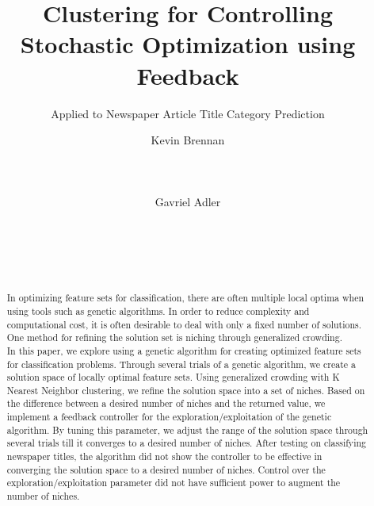 \documentclass{sig-alternate}
\begin{document}
%

\title{Clustering for Controlling Stochastic Optimization using Feedback}
\subtitle{Applied to Newspaper Article Title Category Prediction}

\author{
\alignauthor
Kevin Brennan\\
       \\
       \\
       \\
\alignauthor
Gavriel Adler\\
       \\
       \\
       \\
       \\
}


\maketitle
\begin{abstract}
In optimizing feature sets for classification, there are often multiple local optima when using tools such as genetic algorithms. In order to reduce complexity and computational cost, it is often desirable to deal with only a fixed number of solutions. One method for refining the solution set is niching through generalized crowding.\\
\indent In this paper, we explore using a genetic algorithm for creating optimized feature sets for classification problems. Through several trials of a genetic algorithm, we create a solution space of locally optimal feature sets. Using generalized crowding with K Nearest Neighbor clustering, we refine the solution space into a set of niches. Based on the difference between a desired number of niches and the returned value, we implement a feedback controller for the exploration/exploitation of the genetic algorithm. By tuning this parameter, we adjust the range of the solution space through several trials till it converges to a desired number of niches. After testing on classifying newspaper titles, the algorithm did not show the controller to be effective in converging the solution space to a desired number of niches. Control over the exploration/exploitation parameter did not have sufficient power to augment the number of niches.
\end{abstract}
\end{document}
